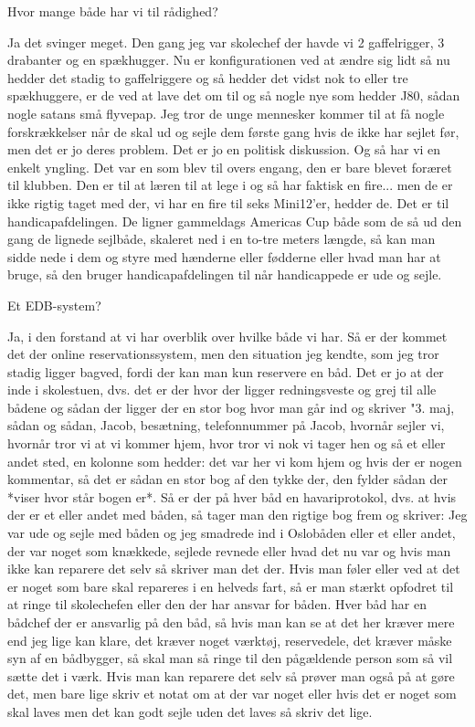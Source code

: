 Hvor mange både har vi til rådighed? 

Ja det svinger meget. Den gang jeg var skolechef der havde vi 2 gaffelrigger, 3 drabanter og en spækhugger. Nu er konfigurationen ved at ændre sig lidt så nu hedder det stadig to gaffelriggere og så hedder det vidst nok to eller tre spækhuggere, er de ved at lave det om til og så nogle nye som hedder J80, sådan nogle satans små flyvepap. Jeg tror de unge mennesker kommer til at få nogle forskrækkelser når de skal ud og sejle dem første gang hvis de ikke har sejlet før, men det er jo deres problem. Det er jo en politisk diskussion. Og så har vi en enkelt yngling. Det var en som blev til overs engang, den er bare blevet foræret til klubben. Den er til at læren til at lege i og så har faktisk en fire... men de er ikke rigtig taget med der, vi har en fire til seks Mini12'er, hedder de. Det er til handicapafdelingen. De ligner gammeldags Americas Cup både som de så ud den gang de lignede sejlbåde, skaleret ned i en to-tre meters længde, så kan man sidde nede i dem og styre med hænderne eller fødderne eller hvad man har at bruge, så den bruger handicapafdelingen til når handicappede er ude og sejle. 

Et EDB-system?

Ja, i den forstand at vi har overblik over hvilke både vi har. Så er der kommet det der online reservationssystem, men den situation jeg kendte, som jeg tror stadig ligger bagved, fordi der kan man kun reservere en båd. Det er jo at der inde i skolestuen, dvs. det er der hvor der ligger redningsveste og grej til alle bådene og sådan der ligger der en stor bog hvor man går ind og skriver "3. maj, sådan og sådan, Jacob, besætning, telefonnummer på Jacob, hvornår sejler vi, hvornår tror vi at vi kommer hjem, hvor tror vi nok vi tager hen og så et eller andet sted, en kolonne som hedder: det var her vi kom hjem og hvis der er nogen kommentar, så det er sådan en stor bog af den tykke der, den fylder sådan der *viser hvor står bogen er*. 
Så er der på hver båd en havariprotokol, dvs. at hvis der er et eller andet med båden, så tager man den rigtige bog frem og skriver: Jeg var ude og sejle med båden og jeg smadrede ind i Oslobåden eller et eller andet, der var noget som knækkede, sejlede revnede eller hvad det nu var og hvis man ikke kan reparere det selv så skriver man det der. Hvis man føler eller ved at det er noget som bare skal repareres i en helveds fart, så er man stærkt opfodret til at ringe til skolechefen eller den der har ansvar for båden. Hver båd har en bådchef der er ansvarlig på den båd, så hvis man kan se at det her kræver mere end jeg lige kan klare, det kræver noget værktøj, reservedele, det kræver måske syn af en bådbygger, så skal man så ringe til den pågældende person som så vil sætte det i værk. Hvis man kan reparere det selv så prøver man også på at gøre det, men bare lige skriv et notat om at der var noget eller hvis det er noget som skal laves men det kan godt sejle uden det laves så skriv det lige. 

